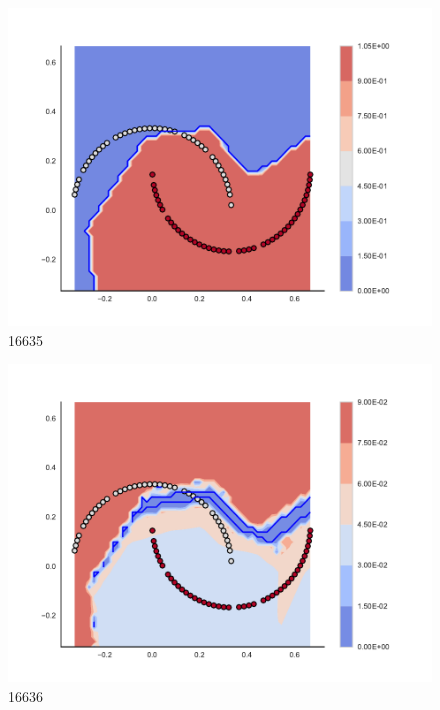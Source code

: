 \begin{subfigure}[b]{0.09\textwidth}
    \includegraphics[clip, trim=2.35cm 1.75cm 4.5cm 0cm,width=\textwidth]{img/convergence/16635.pdf}
    \caption{16635}
    \label{fig:convergence_16635}
\end{subfigure}
%
\begin{subfigure}[b]{0.09\textwidth}
    \includegraphics[clip, trim=2.35cm 1.75cm 4.5cm 0cm,width=\textwidth]{img/convergence/16636.pdf}
    \caption{16636}
    \label{fig:convergence_16636}
\end{subfigure}
%
